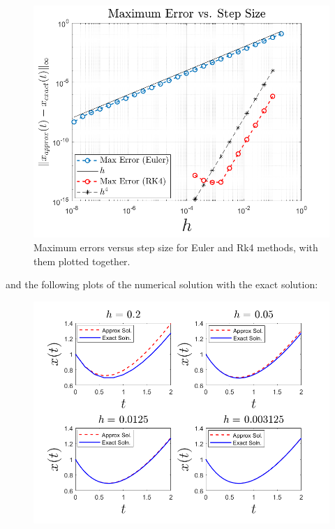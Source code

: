 \documentclass{article}
\begin{document}
\begin{itemize}
\begin{figure}[H]
        \newline
        \includegraphics[scale = 0.3]{euler_rk4_error.png}
        \caption{Maximum errors versus step size for Euler and Rk4 methods, with them plotted together.}
    \end{figure}
    and the following plots of the numerical solution with the exact solution:
    \begin{figure}[H]
    \centering
        \includegraphics[scale = 0.5]{eulerConvergence.png}
        \newline

\end{figure}
\end{itemize}
\end{document}

